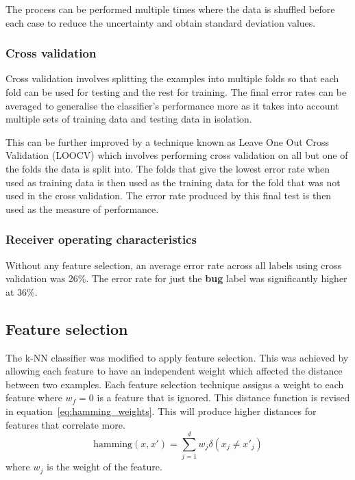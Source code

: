 The process can be performed multiple times where the data is shuffled before each case to reduce the uncertainty and obtain
standard deviation values.

\subsubsection{Cross validation}
Cross validation involves splitting the examples into multiple folds so that each fold can be used for testing and the rest for
training. The final error rates can be averaged to generalise the classifier's performance more as it takes into account
multiple sets of training data and testing data in isolation.

This can be further improved by a technique known as Leave One Out Cross Validation (LOOCV) which involves performing cross
validation on all but one of the folds the data is split into. The folds that give the lowest error rate when used as training
data is then used as the training data for the fold that was not used in the cross validation. The error rate produced by this
final test is then used as the measure of performance.

\subsubsection{Receiver operating characteristics}


Without any feature selection, an average error rate across all labels using cross validation was 26\%. The error rate for just
the \textbf{bug} label was significantly higher at 36\%.

\subsection{Feature selection}
The k-NN classifier was modified to apply feature selection. This was achieved by allowing each feature to have an independent
weight which affected the distance between two examples. Each feature selection technique assigns a weight to each feature where
$w_f = 0$ is a feature that is ignored. This distance function is revised in equation~\ref{eq:hamming_weights}. This will
produce higher distances for features that correlate more.
\begin{equation}
	\label{eq:hamming_weights}
	\mathrm{hamming}(x,x') = \sum^d_{j=1} w_{j} \delta (x_{j} \neq x'_{j})
\end{equation}
where $w_{j}$ is the weight of the feature.

